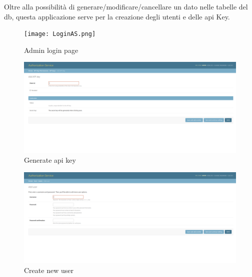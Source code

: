 Oltre alla possibilità di generare/modificare/cancellare un dato nelle tabelle del db, questa applicazione serve per la creazione degli utenti e delle api Key.
\begin{figure}
\begin{center}
  \texttt{[image: LoginAS.png]}%
  \caption{Admin login page}
  \label{fig:LoginAS}
\end{center}
\end{figure}
\begin{figure}
\begin{center}
  \includegraphics[width=1\textwidth]{images/AddAPIkeyAS.png}%
  \caption{Generate api key}
  \label{fig:AddAPIkeyAS}
\end{center}
\end{figure}
\begin{figure}
\begin{center}
  \includegraphics[width=1\textwidth]{images/AddUserAS.png}%
  \caption{Create new user}
  \label{fig:AddUserAS}
\end{center}
\end{figure}

\newpage
